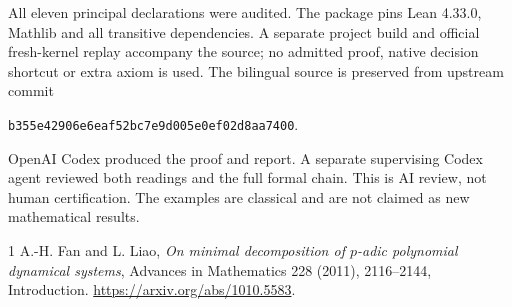 \documentclass[11pt]{article}
\begin{document}
All eleven principal declarations were audited. The package pins Lean
4.33.0, Mathlib and all transitive dependencies. A separate project
build and official fresh-kernel replay accompany the source; no admitted
proof, native decision shortcut or extra axiom is used. The bilingual
source is preserved from upstream commit\par\noindent
\texttt{b355e42906e6eaf52bc7e9d005e0ef02d8aa7400}.\par
OpenAI Codex produced the proof and report. A separate supervising Codex
agent reviewed both readings and the full formal chain. This is AI
review, not human certification. The examples are classical and are
not claimed as new mathematical results.

\begin{thebibliography}{1}
 A.-H. Fan and L. Liao,
\emph{On minimal decomposition of $p$-adic polynomial dynamical systems},
Advances in Mathematics 228 (2011), 2116--2144, Introduction.
\url{https://arxiv.org/abs/1010.5583}.
\end{thebibliography}
\end{document}
